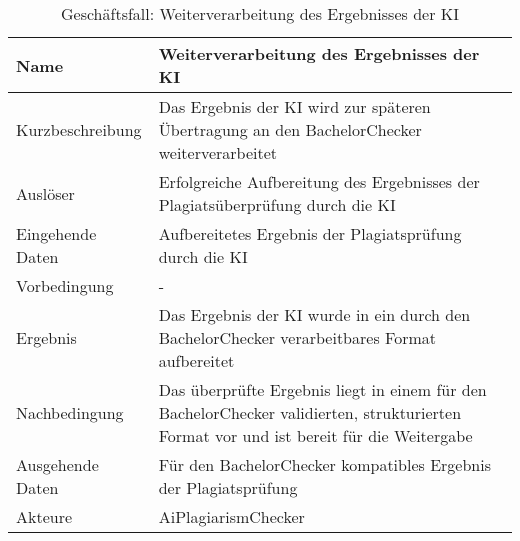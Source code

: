 \begin{table}[H]
    \begin{tabularx}{\textwidth}{|l|X|}
        \hline
        \textbf{Name}    & \textbf{Weiterverarbeitung des Ergebnisses der KI}                                                                                      \\
        \hline
        Kurzbeschreibung & Das Ergebnis der KI wird zur späteren Übertragung an den BachelorChecker weiterverarbeitet                                              \\
        \hline
        Auslöser         & Erfolgreiche Aufbereitung des Ergebnisses der Plagiatsüberprüfung durch die KI                                                          \\
        \hline
        Eingehende Daten & Aufbereitetes Ergebnis der Plagiatsprüfung durch die KI                                                                                 \\
        \hline
        Vorbedingung     & -                                                                                                                                       \\
        \hline
        Ergebnis         & Das Ergebnis der KI wurde in ein durch den BachelorChecker verarbeitbares Format aufbereitet                                            \\
        \hline
        Nachbedingung    & Das überprüfte Ergebnis liegt in einem für den BachelorChecker validierten, strukturierten Format vor und ist bereit für die Weitergabe \\
        \hline
        Ausgehende Daten & Für den BachelorChecker kompatibles Ergebnis der Plagiatsprüfung                                                                        \\
        \hline
        Akteure          & AiPlagiarismChecker                                                                                                                     \\
        \hline
    \end{tabularx}
    \caption{Geschäftsfall: Weiterverarbeitung des Ergebnisses der KI}
    \label{tab:weiterverarbeitung-des-ergebnisses-der-ki}
\end{table}


